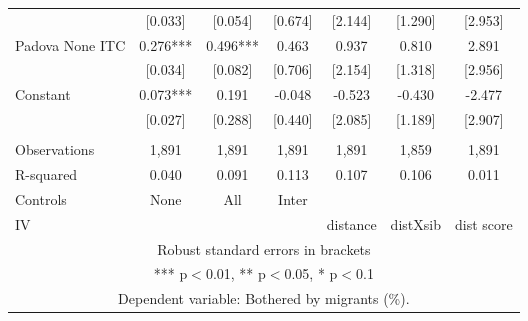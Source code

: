 \begin{tabular}{lcccccc}
 & [0.033] & [0.054] & [0.674] & [2.144] & [1.290] & [2.953] \\
Padova None ITC & 0.276*** & 0.496*** & 0.463 & 0.937 & 0.810 & 2.891 \\
 & [0.034] & [0.082] & [0.706] & [2.154] & [1.318] & [2.956] \\
Constant & 0.073*** & 0.191 & -0.048 & -0.523 & -0.430 & -2.477 \\
 & [0.027] & [0.288] & [0.440] & [2.085] & [1.189] & [2.907] \\
 &  &  &  &  &  &  \\
Observations & 1,891 & 1,891 & 1,891 & 1,891 & 1,859 & 1,891 \\
R-squared & 0.040 & 0.091 & 0.113 & 0.107 & 0.106 & 0.011 \\
Controls & None & All & Inter &  &  &  \\
 IV &  &  &  & distance & distXsib & dist score \\ \hline
\multicolumn{7}{c}{ Robust standard errors in brackets} \\
\multicolumn{7}{c}{ *** p$<$0.01, ** p$<$0.05, * p$<$0.1} \\
\multicolumn{7}{c}{ Dependent variable: Bothered by migrants (\%).} \\
\end{tabular}
